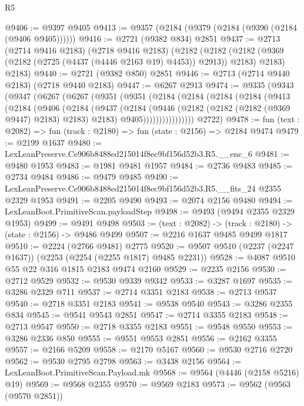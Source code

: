 \begin{lexlean}{R5}
\begin{coremodule}
@9406 := @9397 @9405
@9413 := @9357 (@2184 (@9379 (@2184 (@9390 (@2184 (@9406 @9405))))))
@9416 := @2721 (@9382 @834) @2851
@9437 := @2713
    (@2714 @9416 @2183)
    (@2718 @9416 @2183)
    (@2182
      (@2182 (@2182 (@9369 (@2182 (@2725 (@4437 (@4446 @2163 @19) @4453)) @2913)) @2183) @2183)
      @2183)
@9440 := @2721 (@9382 @850) @2851
@9446 := @2713 (@2714 @9440 @2183) (@2718 @9440 @2183)
@9447 := @6267 @2913
@9474 := @9335
    (@9343
      (@9347
        (@6267
          (@6267
            (@9351
              (@9351
                (@2184
                  (@2184
                    (@2184
                      (@2184
                        (@9413
                          (@2184
                            (@9406
                              (@2184
                                (@9437
                                  (@2184
                                    (@9446
                                      (@2182 (@2182 (@2182 (@9369 @9447) @2183) @2183) @2183)
                                      @9405))))))))))))))))
      @2722)
@9478 := fun (text : @2082) => fun (track : @2180) => fun (state : @2156) => @2184 @9474
@9479 := @2199 @1637
@9480 := LexLeanPreserve.Ce906b8488ed215014f8ec9bf156d52b3.R5.__enc_6
@9481 := @9480 @1953
@9483 := @1981 @9481 @1957
@9484 := @2736 @9483
@9485 := @2734 @9484
@9486 := @9479 @9485
@9490 := LexLeanPreserve.Ce906b8488ed215014f8ec9bf156d52b3.R5.__fits_24 @2355 @2329 @1953
@9491 := @2205 @9490
@9493 := @2074 @2156 @9480
@9494 := LexLeanBoot.PrimitiveScan.payloadStep
@9498 := @9493 (@9494 @2355 @2329 @1953)
@9499 := @9491 @9498
@9503 := (text : @2082) -> (track : @2180) -> (state : @2156) -> @9486 @9499
@9507 := @2216 @1637 @9485 @9499 @1817
@9510 := @2224 (@2766 @9481) @2775
@9520 := @9507 @9510 (@2237 (@2247 @1637)) (@2253 (@2254 (@2255 @1817) @9485 @2231))
@9528 := @4087 @9510 @55 @22 @316 @1815 @2183 @9474 @2160
@9529 := @2235 @2156
@9530 := @2712 @9529
@9532 := @9530 @9339 @9342
@9533 := @3287 @1697
@9535 := @3286 @2329 @711
@9537 := @2714 @3351 @2183
@9538 := @2713 @9537
@9540 := @2718 @3351 @2183
@9541 := @9538 @9540
@9543 := @3286 @2355 @834
@9545 := @9541 @9543 @2851
@9547 := @2714 @3355 @2183
@9548 := @2713 @9547
@9550 := @2718 @3355 @2183
@9551 := @9548 @9550
@9553 := @3286 @2336 @850
@9555 := @9551 @9553 @2851
@9556 := @2162 @3355
@9557 := @2166 @5209
@9558 := @2170 @5167
@9560 := @9530 @2716 @2720
@9562 := @9530 @2795 @2798
@9563 := @3438 @2156
@9564 := LexLeanBoot.PrimitiveScan.Payload.mk
@9568 := @9564 (@4446 (@2158 @5216) @19)
@9569 := @9568 @2355
@9570 := @9569 @2183
@9573 := @9562 (@9563 (@9570 @2851))

\end{coremodule}
\end{lexlean}
